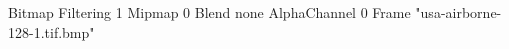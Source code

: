 {Bitmap
	{Filtering 1}
	{Mipmap 0}
	{Blend none}
	{AlphaChannel 0}
	{Frame "usa-airborne-128-1.tif.bmp"}
}
